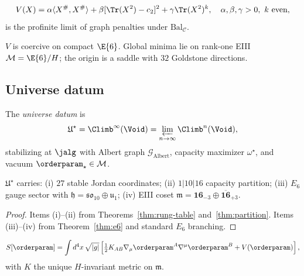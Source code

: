 \begin{definition}[Potential]\label{def:potential}
\begin{equation}\label{eq:potential}
  V(X)=\alpha\langle X^{\#},X^{\#}\rangle+\beta[\Tr(X^2)-c_2]^2+\gamma\Tr(X^2)^k,
  \quad \alpha,\beta,\gamma>0,\ k\ \text{even},
\end{equation}
is the profinite limit of graph penalties under $\mathrm{Bal}_{\mathcal{C}}$.
\end{definition}

\begin{theorem}\label{thm:vacuum}
$V$ is coercive on compact $\E{6}$. Global minima lie on rank-one EIII
$\mathcal{M}=\E{6}/H$; the origin is a saddle with $32$ Goldstone directions.
\end{theorem}

\subsection{Universe datum}
\label{sec:universe:datum}

\begin{definition}[Universe]\label{def:universe}
The \emph{universe datum} is
\begin{equation}\label{eq:universe}
  \mathfrak{U}^\star=\Climb^\infty(\Void)
  =\varprojlim_{n\to\infty}\Climb^n(\Void),
\end{equation}
stabilizing at $\jalg$ with Albert graph $\mathcal{G}_{\mathrm{Albert}}$,
capacity maximizer $\omega^\star$, and vacuum $\orderparam_\star\in\mathcal{M}$.
\end{definition}

\begin{theorem}\label{thm:universe}
$\mathfrak{U}^\star$ carries: (i) $27$ stable Jordan coordinates;
(ii) $1|10|16$ capacity partition; (iii) $E_6$ gauge sector with
$\mathfrak{h}=\mathfrak{so}_{10}\oplus\mathfrak{u}_1$; (iv) EIII coset
$\mathfrak{m}=\mathbf{16}_{-3}\oplus\overline{\mathbf{16}}_{+3}$.
\end{theorem}

\begin{proof}
Items (i)--(ii) from Theorems~\ref{thm:rung-table} and~\ref{thm:partition}.
Items (iii)--(iv) from Theorem~\ref{thm:e6} and standard $E_6$ branching.
\end{proof}

\begin{equation}\label{eq:action}
  S[\orderparam]=\int d^4x\,\sqrt{|g|}\left[\tfrac12 K_{AB}\nabla_\mu\orderparam^A\nabla^\mu\orderparam^B+V(\orderparam)\right],
\end{equation}
with $K$ the unique $H$-invariant metric on $\mathfrak{m}$.